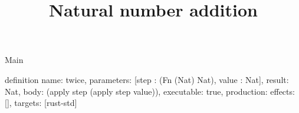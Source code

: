 \begin{lexlean}{Main}
\title{Natural number addition}
\begin{semanticmodule}
definition{
  name: twice,
  parameters: [step : (Fn (Nat) Nat), value : Nat],
  result: Nat,
  body: (apply step (apply step value)),
  executable: true,
  production: {effects: [], targets: [rust-std]}
}
\end{semanticmodule}
\end{lexlean}
